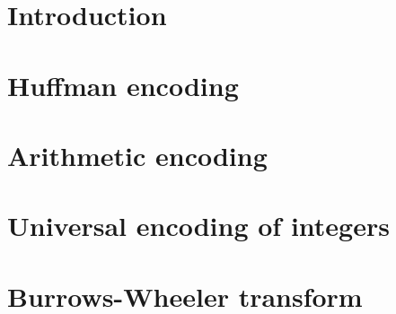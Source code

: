 \documentclass[draft, dawn]{lectures2}
\begin{document}
    \maketitle

    \section{Introduction}
    

    \section{Huffman encoding}
    

    \section{Arithmetic encoding}
    

    \section{Universal encoding of integers}
    

    \section{Burrows-Wheeler transform}
    

    \printbibliography
    \printglossaries
\end{document}
